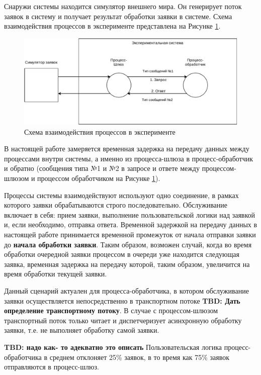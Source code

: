 Снаружи системы находится симулятор внешнего мира. Он генерирует поток заявок в систему и получает результат обработки заявки в системе. Схема взаимодействия процессов в эксперименте представлена на Рисунке \ref{chapter41:SystemSchema}.

\begin{figure}[!h]
\caption{Схема взаимодействия процессов в эксперименте}
\label{chapter41:SystemSchema}
\includegraphics[width=\textwidth]{../../graphics/schemes/SystemSchema}
\end{figure}

В настоящей работе замеряется временная задержка на передачу данных между процессами внутри системы, а именно из процесса-шлюза в процесс-обработчик и обратно (сообщения типа №1 и №2 в запросе и ответе между процессом-шлюзом и процессом обработчиком на Рисунке \ref{chapter41:SystemSchema}).

Процессы системы взаимодействуют используют одно соединение, в рамках которого заявки обрабатываются строго последовательно.
Обслуживание включает в себя: прием заявки, выполнение пользовательской логики над заявкой и, если необходимо, отправка ответа.
Временной задержкой на передачу данных в настоящей работе принимается временной промежуток от начала отправки заявки до \textbf{начала обработки заявки}. Таким образом, возможен случай, когда во время обработки очередной заявки процессом в очереди уже находится следующая заявка, временная задержка на передачу которой, таким образом, увеличится на время обработки текущей заявки.

Данный сценарий актуален для процесса-обработчика, в котором обслуживание заявки осуществляется непосредственно в транспортном потоке \textbf{TBD: Дать определение транспортному потоку}. В случае с процессом-шлюзом транспортный поток только читает и диспетчеризует асинхронную обработку заявки, т.е. не выполняет обработку самой заявки.

\textbf{TBD: надо как- то адекватно это описать}
Пользовательская логика процесс-обработчика в среднем отклоняет 25\% заявок, в то время как 75\% заявок отправляются в процесс-шлюз.

